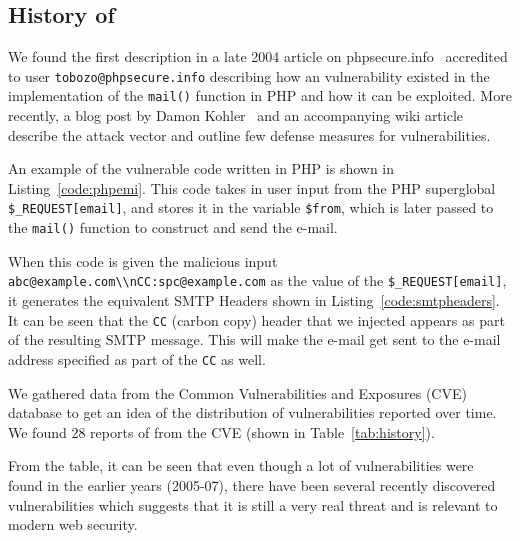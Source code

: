 \subsection{History of \ehi}

We found the first \ehi description in a late 2004 article on phpsecure.info~\cite{Tobozo} accredited to user \lstinline|tobozo@phpsecure.info| describing how an \ehi vulnerability existed in the implementation of the \texttt{mail()} function in PHP and how it can be exploited. More recently, a blog post by Damon Kohler~\cite{DK} and an accompanying wiki article~\cite{Injection} describe the attack vector and outline few defense measures for \ehi vulnerabilities.


An example of the vulnerable code written in PHP is shown in Listing~\ref{code:phpemi}. This code takes in user input from the PHP superglobal \texttt{\$\_REQUEST[\textquotesingle email\textquotesingle]}, and stores it in the variable \texttt{\$from}, which is later passed to the \texttt{mail()} function to construct and send the e-mail.



\begin{sloppypar}
When this code is given the malicious input \texttt{\lstinline{abc@example.com\\nCC:spc@example.com}} as the value of the \texttt{\$\_REQUEST[\textquotesingle email\textquotesingle]}, it generates the equivalent SMTP Headers shown in Listing~\ref{code:smtpheaders}. It can be seen that the \texttt{CC} (carbon copy) header that we injected appears as part of the resulting SMTP message. This will make the e-mail get sent to the e-mail address specified as part of the \texttt{CC} as well. 

%
\end{sloppypar}

We gathered data from the Common Vulnerabilities and Exposures (CVE)~\cite{cve} database to get an idea of the distribution of \ehi vulnerabilities reported over time. We found 28 reports of \ehi from the CVE (shown in Table~\ref*{tab:history}).

From the table, it can be seen that even though a lot of \ehi vulnerabilities were found in the earlier years (2005-07), there have been several recently discovered \ehi vulnerabilities which suggests that it is still a very real threat and is relevant to modern web security.


